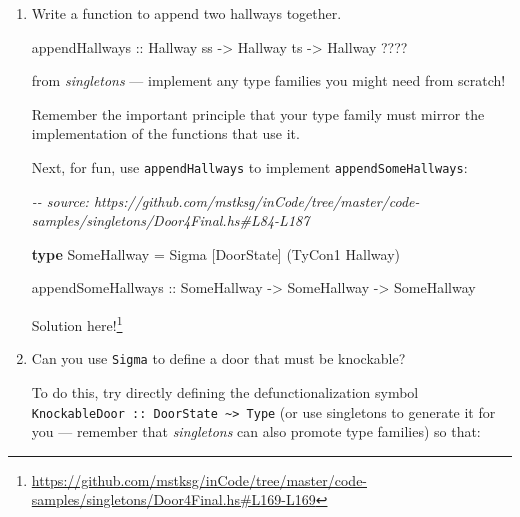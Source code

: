 \documentclass[]{article}
\newenvironment{Shaded}{}{}
\newcommand{\CommentTok}[1]{\textcolor[rgb]{0.38,0.63,0.69}{\textit{#1}}}
\newcommand{\DataTypeTok}[1]{\textcolor[rgb]{0.56,0.13,0.00}{#1}}
\newcommand{\KeywordTok}[1]{\textcolor[rgb]{0.00,0.44,0.13}{\textbf{#1}}}
\newcommand{\NormalTok}[1]{#1}
\newcommand{\OperatorTok}[1]{\textcolor[rgb]{0.40,0.40,0.40}{#1}}
\newcommand{\OtherTok}[1]{\textcolor[rgb]{0.00,0.44,0.13}{#1}}
\renewcommand{\href}[2]{#2\footnote{\url{#1}}}
\begin{document}
\begin{enumerate}
  \texttt{mergedIsKnockable} is only implementable if the merging of two
  DoorStates that are knockable is also knockable. See if you can write the
  implementation!

  \href{https://github.com/mstksg/inCode/tree/master/code-samples/singletons/Door4Final.hs\#L154-L154}{Solution
  here!}
\item
  Write a function to append two hallways together.

\begin{Shaded}
\begin{Highlighting}[]
\NormalTok{appendHallways}
\OtherTok{    ::} \DataTypeTok{Hallway}\NormalTok{ ss}
    \OtherTok{{-}>} \DataTypeTok{Hallway}\NormalTok{ ts}
    \OtherTok{{-}>} \DataTypeTok{Hallway} \OperatorTok{????}
\end{Highlighting}
\end{Shaded}

  from \emph{singletons} --- implement any type families you might need from
  scratch!

  Remember the important principle that your type family must mirror the
  implementation of the functions that use it.

  Next, for fun, use \texttt{appendHallways} to implement
  \texttt{appendSomeHallways}:

\begin{Shaded}
\begin{Highlighting}[]
\CommentTok{{-}{-} source: https://github.com/mstksg/inCode/tree/master/code{-}samples/singletons/Door4Final.hs\#L84{-}L187}

\KeywordTok{type} \DataTypeTok{SomeHallway} \OtherTok{=} \DataTypeTok{Sigma}\NormalTok{ [}\DataTypeTok{DoorState}\NormalTok{] (}\DataTypeTok{TyCon1} \DataTypeTok{Hallway}\NormalTok{)}

\NormalTok{appendSomeHallways}
\OtherTok{    ::} \DataTypeTok{SomeHallway}
    \OtherTok{{-}>} \DataTypeTok{SomeHallway}
    \OtherTok{{-}>} \DataTypeTok{SomeHallway}
\end{Highlighting}
\end{Shaded}

  \href{https://github.com/mstksg/inCode/tree/master/code-samples/singletons/Door4Final.hs\#L169-L169}{Solution
  here!}
\item
  Can you use \texttt{Sigma} to define a door that must be knockable?

  To do this, try directly defining the defunctionalization symbol
  \texttt{KnockableDoor\ ::\ DoorState\ \textasciitilde{}\textgreater{}\ Type}
  (or use singletons to generate it for you --- remember that \emph{singletons}
  can also promote type families) so that:


\end{enumerate}
\end{document}
